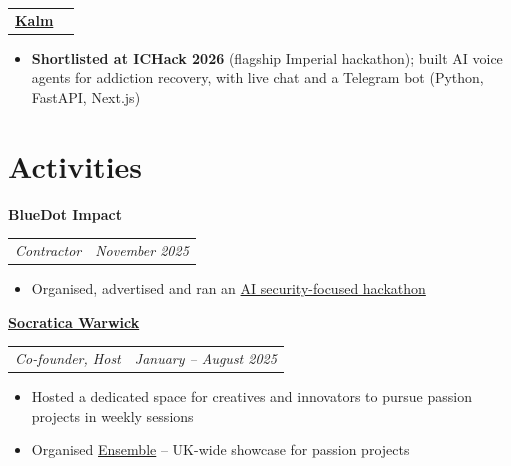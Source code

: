 \documentclass[legalpaper,11pt]{article}
\makeatletter
\newcommand{\resumeSection}[1]{
    \vspace{-9pt}
    \section{#1}
}
\newcommand{\resumeItem}[1]{
  \item\small{#1}
  \vspace{-3pt}
}
\newcommand{\resumeSubheading}[1]{
  \textbf{#1}\\
  \vspace{-1pt}
}
\newcommand{\jobtitleanddate}[2]{
  \begin{tabular*}{0.97\textwidth}{l@{\extracolsep{\fill}}r}
    \textit{\small#1} & \textit{\small#2} \\
  \end{tabular*}\vspace{-4pt}
}
\newcommand{\resumeSubheadingNoJob}[2]{
  \begin{tabular*}{0.97\textwidth}{l@{\extracolsep{\fill}}r}
    \textbf{#1} & \textit{\small#2} \\
  \end{tabular*}
  \vspace{-5pt} %
}
\newcommand{\resumeItemListStart}{\begin{itemize}}
\newcommand{\resumeItemListEnd}{\end{itemize}}
\makeatother
\begin{document}
    \resumeSubheadingNoJob{\href{https://kalm-support-app.vercel.app/}{Kalm}}{}
    \resumeItemListStart
        \resumeItem{\textbf{Shortlisted at ICHack 2026} (flagship Imperial hackathon); built AI voice agents for addiction recovery, with live chat and a Telegram bot (Python, FastAPI, Next.js)}
    \resumeItemListEnd

    

\resumeSection{Activities}
    \resumeSubheading{BlueDot Impact}
    \jobtitleanddate{Contractor}{November 2025}
      \resumeItemListStart
          \resumeItem{Organised, advertised and ran an \href{https://www.linkedin.com/posts/josh-landes12_last-week-may-just-have-been-the-busiest-activity-7399432058445459456-Tnsc?utm_source=share&utm_medium=member_desktop&rcm=ACoAACx8f6sBbkg0YeKp5YIH3tpR5ZO5xRM5Oxw}{AI security-focused hackathon}}
      \resumeItemListEnd

    \resumeSubheading{\href{https://socratica.info/}{Socratica Warwick}}
    \jobtitleanddate{Co-founder, Host}{January -- August 2025}
      \resumeItemListStart
        \resumeItem{Hosted a dedicated space for creatives and innovators to pursue passion projects in weekly sessions}
        \resumeItem{Organised \href{https://ensemble.rodeo/}{Ensemble} -- UK-wide showcase for passion projects}
    \resumeItemListEnd
\end{document}
